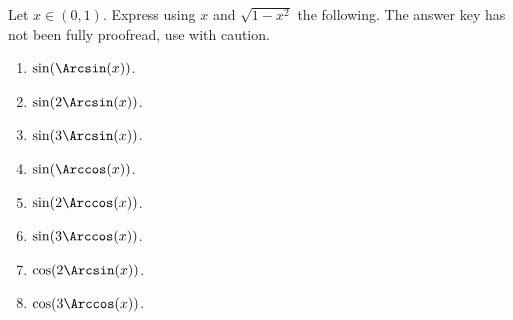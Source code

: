 Let $x\in (0,1)$. Express using $x$ and $\sqrt{1-x^2}$ the following. The answer key has not been fully proofread, use with caution.
\begin{multicols}{2}
\begin{enumerate}
\item $\sin(\Arcsin (x))$. 
\item $\sin(2\Arcsin (x))$. 
\item $\sin(3\Arcsin (x))$. 
\item $\sin(\Arccos (x))$. 
\item $\sin(2\Arccos (x))$. 
\item $\sin(3\Arccos (x))$. 
\item $\cos(2\Arcsin (x))$. 
\item $\cos(3\Arccos (x))$. 
\end{enumerate}
\end{multicols}

